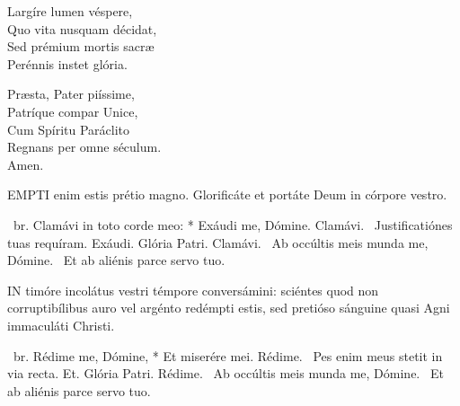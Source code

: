 Largíre lumen véspere,\\
Quo vita nusquam décidat,\\
Sed prémium mortis sacræ\\
Perénnis instet glória.

Præsta, Pater piíssime,\\
Patríque compar Unice,\\
Cum Spíritu Paráclito\\
Regnans per omne séculum.\\
Amen.






\lettrine[lines=2]{E}{MPTI} enim estis prétio magno. Glorificáte et portáte Deum in córpore vestro.


\R\ br. Clamávi in toto corde meo: * Exáudi me, Dómine. Clamávi. \V\ Justificatiónes tuas requíram. Exáudi. Glória Patri. Clamávi. \V\ Ab occúltis meis munda me, Dómine. \R\ Et ab aliénis parce servo tuo.



\lettrine[lines=2]{I}{N} timóre incolátus vestri témpore conversámini: sciéntes quod non corruptibílibus auro vel argénto redémpti estis, sed pretióso sánguine quasi Agni immaculáti Christi.

\R\ br. Rédime me, Dómine, * Et miserére mei. Rédime. \V\ Pes enim meus stetit in via recta. Et. Glória Patri. Rédime. \V\ Ab occúltis meis munda me, Dómine. \R\ Et ab aliénis parce servo tuo.



